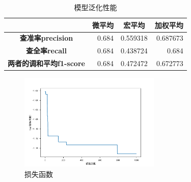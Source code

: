\documentclass{whutmod}
\begin{document}
\begin{table}[!htbp]
	\centering
	\caption{模型泛化性能}
	\begin{tabular}{crrr}
		\toprule
		& \multicolumn{1}{c}{\textbf{微平均}} & \multicolumn{1}{c}{\textbf{宏平均}} & \multicolumn{1}{c}{\textbf{加权平均}} \\
		\midrule
		\textbf{查准率precision} & 0.684 & 0.559318 & 0.687673 \\
		\textbf{查全率recall} & 0.684 & 0.438724 & 0.684 \\
		\textbf{两者的调和平均f1-score} & 0.684 & 0.472472 & 0.672773 \\
		\bottomrule
	\end{tabular}%
	\label{tab:addlabel2}%
\end{table}%

\begin{figure}[!h]
	\centering
	\includegraphics[width=0.6\textwidth]{_loss_time.pdf}
	\caption{损失函数}
\end{figure}

\end{document}
